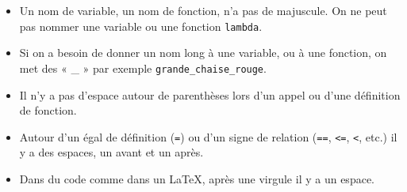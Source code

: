 \documentclass{article}
\newcommand{\p}{\texttt} %
\begin{document}
\begin{itemize}
    \item Un nom de variable, un nom de fonction, n'a pas de majuscule. On ne peut pas nommer une variable ou une fonction \p{lambda}.
    \item Si on a besoin de donner un nom long à une variable, ou à une fonction, on met des « \_ » par exemple \p{grande\_chaise\_rouge}.
    \item Il n'y a pas d'espace autour de parenthèses lors d'un appel ou d'une définition de fonction.
    \item Autour d'un égal de définition (\p{=}) ou d'un signe de relation (\p{==}, \p{<=}, \p{<}, etc.) il y a des espaces, un avant et un après.
    \item Dans du code comme dans un \LaTeX, après une virgule il y a un espace.
\end{itemize}
\end{document}
